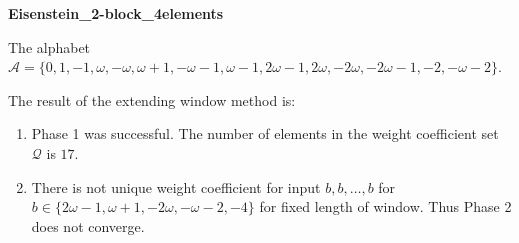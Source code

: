 \begin{exmp}
\textbf{ Eisenstein\_2-block\_4elements }

\label{ex:Eisenstein2-block4elements}

The alphabet $\mathcal{A} =\{0, 1, -1, \omega, -\omega, \omega + 1, -\omega - 1, \omega - 1, 2\omega - 1, 2\omega, -2\omega, -2\omega - 1, -2, -\omega - 2\}$.

The result of the extending window method is:
\begin{enumerate}
    \item Phase 1 was successful.
The number of elements in the weight coefficient set $\mathcal{Q}$ is $17$.

    \item There is not unique weight coefficient for input $b,b,\dots,b$ for $b\in\{2\omega - 1, \omega + 1, -2\omega, -\omega - 2, -4\}$ for fixed length of window. Thus Phase 2 does not converge.

\end{enumerate}
\end{exmp}
